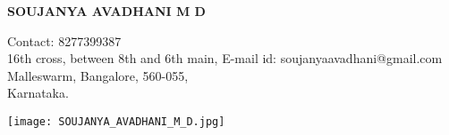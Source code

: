 \documentclass[letterpaper,11pt,oneside]{article}
\begin{document}
	\begin{center}
		\textbf{{\huge SOUJANYA AVADHANI M D}}\\
	\end{center}
	\vspace{-2ex}
	\noindent\hrulefill
	\vspace{5ex}
	
	 \hfill \large {Contact: 8277399387}
	\\
	\large {16th cross, between 8th and 6th main,} \hfill \large {E-mail id: soujanyaavadhani@gmail.com}
	\\
	\large {Malleswarm, Bangalore, 560-055,}
	\\
	\large {Karnataka.}
    
    \hfill \texttt{[image: SOUJANYA\_AVADHANI\_M\_D.jpg]}\\	
    
    \\
    \\
    \\
    \\
\end{document}
